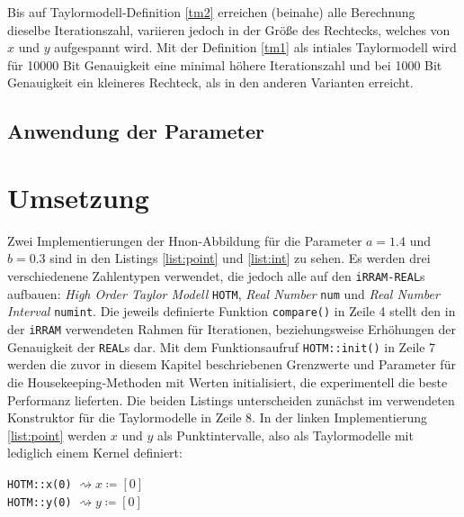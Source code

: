  
Bis auf Taylormodell-Definition \ref{tm2} erreichen (beinahe) alle Berechnung dieselbe Iterationszahl, variieren jedoch in der Größe des Rechtecks, welches von $x$ und $y$ aufgespannt wird. Mit der Definition \ref{tm1} als intiales Taylormodell wird für 10000 Bit Genauigkeit eine minimal höhere Iterationszahl und bei 1000 Bit Genauigkeit ein kleineres Rechteck, als in den anderen Varianten erreicht.
 
 \section{Anwendung der Parameter}
 
 
 
 
 \chapter{Umsetzung}  
 Zwei Implementierungen der H\e non-Abbildung für die Parameter $a=1.4$ und $b=0.3$ sind in den Listings \ref{list:point} und \ref{list:int} zu sehen. Es werden drei verschiedenene Zahlentypen verwendet, die jedoch alle auf den \verb+iRRAM-REAL+s aufbauen: \textit{High Order Taylor Modell} \verb+HOTM+, \textit{Real Number} \verb+num+ und \textit{Real Number Interval} \verb+numint+. Die jeweils definierte Funktion \verb+compare()+ in Zeile 4 stellt den in der \verb+iRRAM+ verwendeten Rahmen für Iterationen, beziehungsweise Erhöhungen der Genauigkeit der \verb+REAL+s dar. Mit dem Funktionsaufruf \verb+HOTM::init()+ in Zeile 7 werden die zuvor in diesem Kapitel beschriebenen Grenzwerte und Parameter für die Housekeeping-Methoden mit Werten initialisiert, die experimentell die beste Performanz lieferten. Die beiden Listings unterscheiden zunächst im verwendeten Konstruktor für die Taylormodelle in Zeile 8. In der linken Implementierung \ref{list:point} werden $x$ und $y$ als Punktintervalle, also als Taylormodelle mit lediglich einem Kernel definiert:
  \begin{center}
  \verb+HOTM::x(0)+ $\rightsquigarrow x\coloneqq [0]$\\
  \verb+HOTM::y(0)+ $\rightsquigarrow y\coloneqq [0]$
 \end{center}

